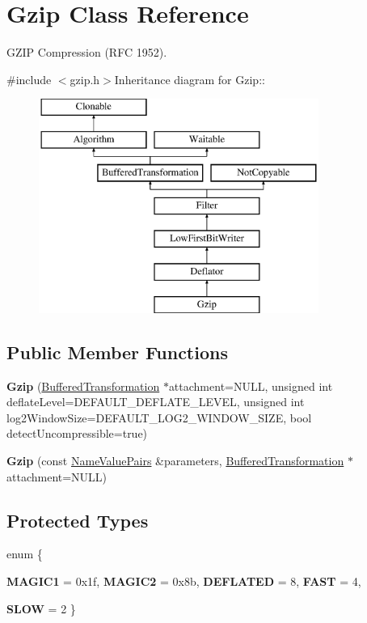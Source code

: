 \hypertarget{class_gzip}{
\section{Gzip Class Reference}
\label{class_gzip}
}


GZIP Compression (RFC 1952).  


{\ttfamily \#include $<$gzip.h$>$}Inheritance diagram for Gzip::\begin{figure}[H]
\begin{center}
\leavevmode
\includegraphics[height=7cm]{class_gzip}
\end{center}
\end{figure}
\subsection*{Public Member Functions}
\begin{DoxyCompactItemize}
\item 
\hypertarget{class_gzip_a1d1b762af2a7ae5053e2870ef57e313b}{
{\bfseries Gzip} (\hyperlink{class_buffered_transformation}{BufferedTransformation} $\ast$attachment=NULL, unsigned int deflateLevel=DEFAULT\_\-DEFLATE\_\-LEVEL, unsigned int log2WindowSize=DEFAULT\_\-LOG2\_\-WINDOW\_\-SIZE, bool detectUncompressible=true)}
\label{class_gzip_a1d1b762af2a7ae5053e2870ef57e313b}

\item 
\hypertarget{class_gzip_ad5db66366a8337baa0bb39402e6e6d73}{
{\bfseries Gzip} (const \hyperlink{class_name_value_pairs}{NameValuePairs} \&parameters, \hyperlink{class_buffered_transformation}{BufferedTransformation} $\ast$attachment=NULL)}
\label{class_gzip_ad5db66366a8337baa0bb39402e6e6d73}

\end{DoxyCompactItemize}
\subsection*{Protected Types}
\begin{DoxyCompactItemize}
\item 
enum \{ \par
{\bfseries MAGIC1} = 0x1f, 
{\bfseries MAGIC2} = 0x8b, 
{\bfseries DEFLATED} = 8, 
{\bfseries FAST} = 4, 
\par
{\bfseries SLOW} = 2
 \}
\end{DoxyCompactItemize}
